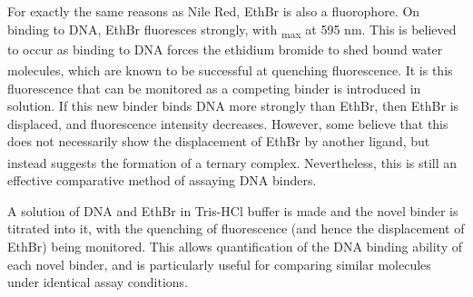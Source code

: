 For exactly the same reasons as Nile Red, EthBr is also a fluorophore. On binding to DNA, EthBr fluoresces strongly, with \textlambda\textsubscript{max} at 595 nm. This is believed to occur as binding to DNA forces the ethidium bromide to shed bound water molecules, which are known to be successful at quenching fluorescence.\textsuperscript{\cite{Olmsted1977MechanismAcids}}  It is this fluorescence that can be monitored as a competing binder is introduced in solution. If this new binder binds DNA more strongly than EthBr, then EthBr is displaced, and fluorescence intensity decreases. However, some believe that this does not necessarily show the displacement of EthBr by another ligand, but instead suggests the formation of a ternary complex.\textsuperscript{\cite{Banerjee2013FluorescenceDNA}} Nevertheless, this is still an effective comparative method of assaying DNA binders. 

A solution of DNA and EthBr in Tris-HCl buffer is made and the novel binder is titrated into it, with the quenching of fluorescence (and hence the displacement of EthBr) being monitored. This allows quantification of the DNA binding ability of each novel binder, and is particularly useful for comparing similar molecules under identical assay conditions. 

